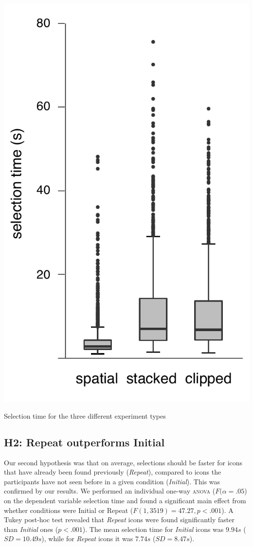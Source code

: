 \documentclass[nobib]{tufte-book} %
\begin{document}
\begin{marginfigure}
  \includegraphics[width=\linewidth]{duration-types.pdf}
  \caption{Selection time for the three different experiment types}
  \label{fig:duration-types}
\end{marginfigure}

\subsection{H2: Repeat outperforms Initial}
Our second hypothesis was that on average, selections should be faster for icons that have already been found previously (\emph{Repeat}), compared to icons the participants have not seen before in a given condition (\emph{Initial}). This was confirmed by our results. We performed an individual one-way \textsc{anova} ($F(\alpha = .05$) on the dependent variable selection time and found a significant main effect from whether conditions were Initial or Repeat ($F(1,3519) = 47.27, p < .001$).
A Tukey post-hoc test revealed that \emph{Repeat} icons were found significantly faster than \emph{Initial} ones ($p < .001$). The mean selection time for \emph{Initial} icons was $9.94 s$ ($SD = 10.49 s$), while for \emph{Repeat} icons it was $7.74 s$ ($SD = 8.47 s$).
\end{document}
